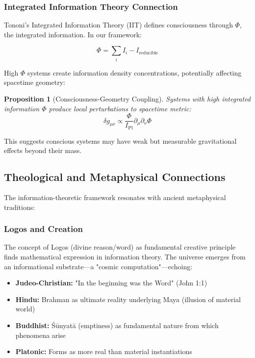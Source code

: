 \documentclass[12pt,a4paper]{article}
\newtheorem{proposition}[theorem]{Proposition}
\theoremstyle{remark}
\begin{document}
\subsubsection{Integrated Information Theory Connection}

Tononi's Integrated Information Theory (IIT) defines consciousness through $\Phi$, the integrated information. In our framework:

\begin{equation}
\Phi = \sum_{i} I_i - I_{\text{reducible}}
\end{equation}

High $\Phi$ systems create information density concentrations, potentially affecting spacetime geometry:

\begin{proposition}[Consciousness-Geometry Coupling]
Systems with high integrated information $\Phi$ produce local perturbations to spacetime metric:
\begin{equation}
\delta g_{\mu\nu} \propto \frac{\Phi}{I_{\text{Pl}}}\partial_\mu\partial_\nu\Phi
\end{equation}
\end{proposition}

This suggests conscious systems may have weak but measurable gravitational effects beyond their mass.

\subsection{Theological and Metaphysical Connections}

The information-theoretic framework resonates with ancient metaphysical traditions:

\subsubsection{Logos and Creation}

The concept of Logos (divine reason/word) as fundamental creative principle finds mathematical expression in information theory. The universe emerges from an informational substrate—a "cosmic computation"—echoing:

\begin{itemize}
\item \textbf{Judeo-Christian:} "In the beginning was the Word" (John 1:1)
\item \textbf{Hindu:} Brahman as ultimate reality underlying Maya (illusion of material world)
\item \textbf{Buddhist:} Śūnyatā (emptiness) as fundamental nature from which phenomena arise
\item \textbf{Platonic:} Forms as more real than material instantiations
\end{itemize}
\end{document}
